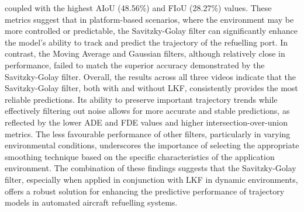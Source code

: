 \documentclass[12pt,oneside]{book} %
\begin{document}
coupled with the highest AIoU (48.56\%) and FIoU (28.27\%) values. These
metrics suggest that in platform-based scenarios, where the environment may be
more controlled or predictable, the Savitzky-Golay filter can significantly
enhance the model's ability to track and predict the trajectory of the
refuelling port. In contrast, the Moving Average and Gaussian filters, although
relatively close in performance, failed to match the superior accuracy
demonstrated by the Savitzky-Golay filter. Overall, the results across all
three videos indicate that the Savitzky-Golay filter, both with and without
LKF, consistently provides the most reliable predictions. Its ability to
preserve important trajectory trends while effectively filtering out noise
allows for more accurate and stable predictions, as reflected by the lower ADE
and FDE values and higher intersection-over-union metrics. The less favourable
performance of other filters, particularly in varying environmental conditions,
underscores the importance of selecting the appropriate smoothing technique
based on the specific characteristics of the application environment. The
combination of these findings suggests that the Savitzky-Golay filter,
especially when applied in conjunction with LKF in dynamic environments, offers
a robust solution for enhancing the predictive performance of trajectory models
in automated aircraft refuelling systems.
\end{document}
